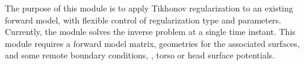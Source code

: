 
\newcommand{\x}{\times}


\ModuleRefSummary

The purpose of this module is to apply Tikhonov regularization to an
existing forward model, with flexible control of regularization type and
parameters.  Currently, the module solves the inverse problem at a single
time instant.  This module requires a forward model matrix, geometries for
the associated surfaces, and some remote boundary conditions, \ie{}, torso or
head surface potentials.


\ModuleRefUse

